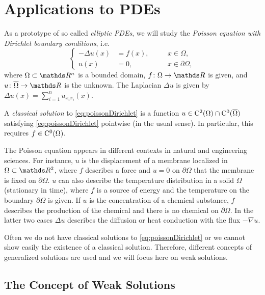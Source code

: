 \chapter{Applications to PDEs}
\label{chap:appsToPDEs}

As a prototype of so called \emph{elliptic PDEs}, we will study the \emph{Poisson equation with Dirichlet boundary conditions}, i.e.
\begin{equation}
  \label{eq:poissonDirichlet}
  \left\{
    \begin{alignedat}{2}
    -\Delta u(x) &= f(x), &&\quad x \in \Omega, \\
    u(x) &= 0, &&\quad x \in \partial\Omega,
    \end{alignedat}
    \right.
\end{equation}
where $\Omega \subset \R^n$ is a bounded domain, $f \colon \Omega \to \R$ is given, and $u \colon \overline \Omega \to \R$ is the unknown.
The Laplacian $\Delta u$ is given by $\Delta u(x) = \sum_{i = 1}^n u_{x_i x_i}(x)$.

\begin{defn}
  A \emph{classical solution} to \eqref{eq:poissonDirichlet} is a function $u \in \mathrm{C}^2(\Omega) \cap \mathrm{C}^0(\overline\Omega)$ satisfying \eqref{eq:poissonDirichlet} pointwise (in the usual sense).
  In particular, this requires $f \in \mathrm{C}^0(\Omega)$.
\end{defn}

  The Poisson equation appears in different contexts in natural and engineering sciences.
  For instance, $u$ is the displacement of a membrane localized in $\Omega \subset \R^2$, where $f$ describes a force and $u = 0$ on $\partial\Omega$ that the membrane is fixed on $\partial\Omega$.
  $u$ can also describe the temperature distribution in a solid $\Omega$ (stationary in time), where $f$ is a source of energy and the temperature on the boundary $\partial\Omega$ is given.
  If $u$ is the concentration of a chemical substance, $f$ describes the production of the chemical and there is no chemical on $\partial\Omega$.
  In the latter two cases $\Delta u$ describes the diffusion or heat conduction with the flux $-\nabla u$.

  Often we do not have classical solutions to \eqref{eq:poissonDirichlet} or we cannot show easily the existence of a classical solution.
  Therefore, different concepts of generalized solutions are used and we will focus here on weak solutions.

\section{The Concept of Weak Solutions}
\label{sec:weakSolutions}

